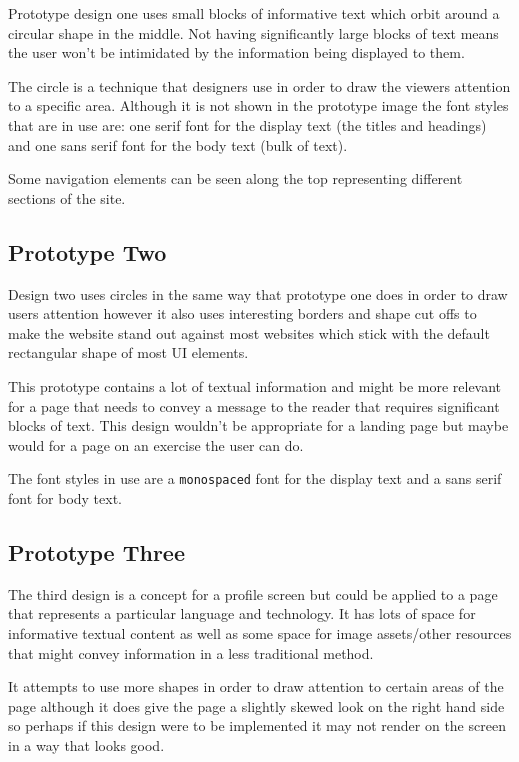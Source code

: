 Prototype design one uses small blocks of informative text which orbit around a circular shape in the middle. Not having significantly large blocks of text means the user won't be intimidated by the information being displayed to them. 

The circle is a technique that designers use in order to draw the viewers attention to a specific area. Although it is not shown in the prototype image the font styles that are in use are: one serif font for the display text (the titles and headings) and one sans serif font for the body text (bulk of text).

Some navigation elements can be seen along the top representing different sections of the site.

\subsection{Prototype Two}

Design two uses circles in the same way that prototype one does in order to draw users attention however it also uses interesting borders and shape cut offs to make the website stand out against most websites which stick with the default rectangular shape of most UI elements.

This prototype contains a lot of textual information and might be more relevant for a page that needs to convey a message to the reader that requires significant blocks of text. This design wouldn't be appropriate for a landing page but maybe would for a page on an exercise the user can do.

The font styles in use are a \texttt{monospaced} font for the display text and a sans serif font for body text.

\subsection{Prototype Three}

The third design is a concept for a profile screen but could be applied to a page that represents a particular language and technology. It has lots of space for informative textual content as well as some space for image assets/other resources that might convey information in a less traditional method.

It attempts to use more shapes in order to draw attention to certain areas of the page although it does give the page a slightly skewed look on the right hand side so perhaps if this design were to be implemented it may not render on the screen in a way that looks good.

